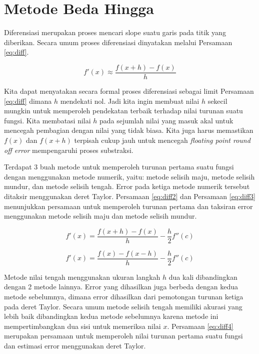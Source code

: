 \documentclass[]{book}
\theoremstyle{definition}
\theoremstyle{definition}
\theoremstyle{definition}
\theoremstyle{remark}
\begin{document}
\hypertarget{finitediff}{%
\section{Metode Beda Hingga}\label{finitediff}}

Diferensiasi merupakan proses mencari slope suatu garis pada titik yang diberikan. Secara umum proses diferensiasi dinyatakan melalui Persamaan \eqref{eq:diff}.

\begin{equation}
f'\left(x\right) \approx \frac{f\left(x+h\right)-f\left(x\right)}{h}
  \label{eq:diff}
\end{equation}

Kita dapat menyatakan secara formal proses diferensiasi sebagai limit Persamaan \eqref{eq:diff} dimana \(h\) mendekati nol. Jadi kita ingin membuat nilai \(h\) sekecil mungkin untuk memperoleh pendekatan terbaik terhadap nilai turunan suatu fungsi. Kita membatasi nilai \(h\) pada sejumlah nilai yang masuk akal untuk mencegah pembagian dengan nilai yang tidak biasa. Kita juga harus memastikan \(f\left(x\right)\) dan \(f\left(x+h\right)\) terpisah cukup jauh untuk mencegah \emph{floating point round off error} mempengaruhi proses substraksi.

Terdapat 3 buah metode untuk memperoleh turunan pertama suatu fungsi dengan menggunakan metode numerik, yaitu: metode selisih maju, metode selisih mundur, dan metode selisih tengah. Error pada ketiga metode numerik tersebut ditaksir menggunakan deret Taylor. Persamaan \eqref{eq:diff2} dan Persamaan \eqref{eq:diff3} menunjukkan persamaan untuk memperoleh turunan pertama dan taksiran error menggunakan metode selisih maju dan metode selisih mundur.

\begin{equation}
f'\left(x\right) = \frac{f\left(x+h\right)-f\left(x\right)}{h} - \frac{h}{2} f''\left(c\right)
  \label{eq:diff2}
\end{equation}

\begin{equation}
f'\left(x\right) = \frac{f\left(x\right)-f\left(x-h\right)}{h} - \frac{h}{2} f''\left(c\right)
  \label{eq:diff3}
\end{equation}

Metode nilai tengah menggunakan ukuran langkah \(h\) dua kali dibandingkan dengan 2 metode lainnya. Error yang dihasilkan juga berbeda dengan kedua metode sebelumnya, dimana error dihasilkan dari pemotongan turunan ketiga pada deret Taylor. Secara umum metode selisih tengah memiliki akurasi yang lebih baik dibandingkan kedua metode sebelumnya karena metode ini mempertimbangkan dua sisi untuk memeriksa nilai \(x\). Persamaan \eqref{eq:diff4} merupakan persamaan untuk memperoleh nilai turunan pertama suatu fungsi dan estimasi error menggunakan deret Taylor.
\end{document}
